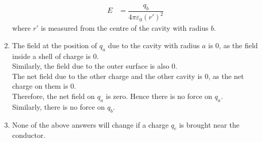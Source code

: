 \documentclass[fleqn, a4paper, 11pt, oneside]{amsart}
\theoremstyle{definition}
\theoremstyle{theorem}
\begin{document}
\begin{solution}
\begin{enumerate}[leftmargin=*]
\begin{align*}
				E &= \dfrac{q_b}{4 \pi \varepsilon_0 (r')^2}
			\end{align*}
			where $r'$ is measured from the centre of the cavity with radius $b$.
		\item
			The field at the position of $q_a$ due to the cavity with radius $a$ is $0$, as the field inside a shell of charge is $0$.\\
			Similarly, the field due to the outer surface is also $0$.\\
			The net field due to the other charge and the other cavity is $0$, as the net charge on them is $0$.\\
			Therefore, the net field on $q_a$ is zero.
			Hence there is no force on $q_a$.\\
			Similarly, there is no force on $q_b$.
		\item
			None of the above answers will change if a charge $q_c$ is brought near the conductor.
	\end{enumerate}
\end{solution}
\end{document}
